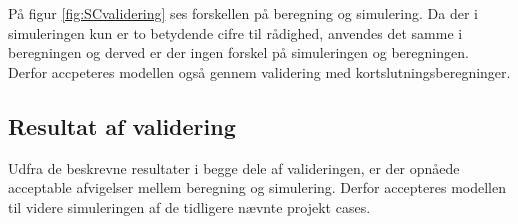 På figur \ref{fig:SCvalidering} ses forskellen på beregning og simulering. Da der i simuleringen kun er to betydende cifre til rådighed, anvendes det samme i beregningen og derved er der ingen forskel på simuleringen og beregningen. Derfor accpeteres modellen også gennem validering med kortslutningsberegninger.

\subsection{Resultat af validering}

Udfra de beskrevne resultater i begge dele af valideringen, er der opnåede acceptable afvigelser mellem beregning og simulering. Derfor accepteres modellen til videre simuleringen af de tidligere nævnte projekt cases.